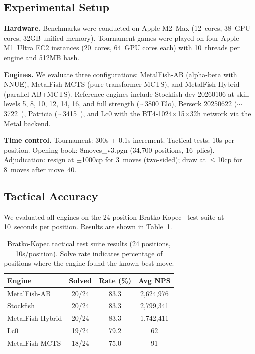 \documentclass{svproc}
\begin{document}
\subsection{Experimental Setup}
\label{sec:eval-setup}

\textbf{Hardware.} Benchmarks were conducted on Apple M2~Max (12~cores, 38~GPU cores, 32GB unified memory). Tournament games were played on four Apple M1~Ultra EC2 instances (20~cores, 64~GPU cores each) with 10~threads per engine and 512MB hash.

\textbf{Engines.} We evaluate three configurations: MetalFish-AB (alpha-beta with NNUE), MetalFish-MCTS (pure transformer MCTS), and MetalFish-Hybrid (parallel AB+MCTS). Reference engines include Stockfish dev-20260106 at skill levels 5, 8, 10, 12, 14, 16, and full strength ($\sim$3800 Elo), Berserk 20250622 ($\sim$3722~\cite{ccrl}), Patricia ($\sim$3415~\cite{ccrl}), and Lc0 with the BT4-1024$\times$15$\times$32h network via the Metal backend.

\textbf{Time control.} Tournament: 300s + 0.1s increment. Tactical tests: 10s per position. Opening book: 8moves\_v3.pgn (34,700 positions, 16~plies). Adjudication: resign at $\pm$1000cp for 3~moves (two-sided); draw at $\leq$10cp for 8~moves after move~40.

\subsection{Tactical Accuracy}
\label{sec:eval-tactical}

We evaluated all engines on the 24-position Bratko-Kopec~\cite{bratko1982advice} test suite at 10~seconds per position. Results are shown in Table~\ref{tab:tactical}.

\begin{table}[!htbp]
\centering
\caption{Bratko-Kopec tactical test suite results (24 positions, 10s/position). Solve rate indicates percentage of positions where the engine found the known best move.}
\label{tab:tactical}
\begin{tabular}{lccc}
\toprule
\textbf{Engine} & \textbf{Solved} & \textbf{Rate (\%)} & \textbf{Avg NPS} \\
\midrule
MetalFish-AB   & 20/24 & 83.3 & 2,624,976 \\
Stockfish      & 20/24 & 83.3 & 2,799,341 \\
MetalFish-Hybrid & 20/24 & 83.3 & 1,742,411 \\
Lc0            & 19/24 & 79.2 & 62 \\
MetalFish-MCTS & 18/24 & 75.0 & 91 \\
\bottomrule
\end{tabular}
\end{table}
\end{document}
